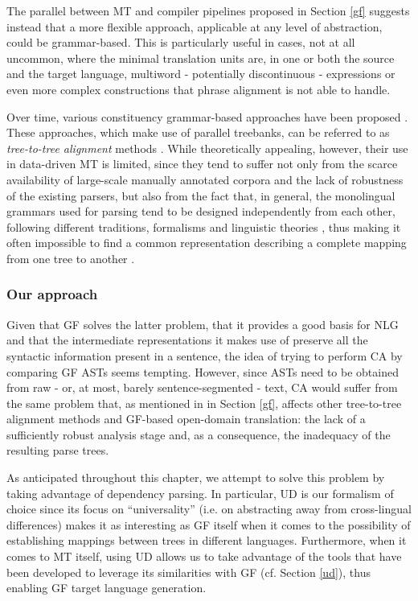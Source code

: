 The parallel between MT and compiler pipelines proposed in Section \ref{gf} suggests instead that a more flexible approach, applicable at any level of abstraction, could be grammar-based. 
This is particularly useful in cases, not at all uncommon, where the minimal translation units are, in one or both the source and the target language, multiword - potentially discontinuous - expressions or even more complex constructions that phrase alignment is not able to handle. \smallskip 

Over time, various constituency grammar-based approaches have been proposed \cite{t2t1, t2t2}. 
These approaches, which make use of parallel treebanks, can be referred to as \textit{tree-to-tree alignment} methods \cite{bitext}. 
While theoretically appealing, however, their use in data-driven MT is limited, since they tend to suffer not only from the scarce availability of large-scale manually annotated corpora and the lack of robustness of the existing parsers, but also from the fact that, in general, the monolingual grammars used for parsing tend to be designed independently from each other, following different traditions, formalisms and linguistic theories \cite{nlphandbook}, thus making it often impossible to find a common representation describing a complete mapping from one tree to another \cite{bitext}.

\subsubsection{Our approach} \label{ourapproach}
Given that GF solves the latter problem, that it provides a good basis for NLG and that the intermediate representations it makes use of preserve all the syntactic information present in a sentence, the idea of trying to perform CA by comparing GF ASTs seems tempting. 
However, since ASTs need to be obtained from raw - or, at most, barely sentence-segmented - text, CA would suffer from the same problem that, as mentioned in in Section \ref{gf}, affects other tree-to-tree alignment methods and GF-based open-domain translation: the lack of a sufficiently robust analysis stage and, as a consequence, the inadequacy of the resulting parse trees. \smallskip

As anticipated throughout this chapter, we attempt to solve this problem by taking advantage of dependency parsing. 
In particular, UD is our formalism of choice since its focus on ``universality'' (i.e. on abstracting away from cross-lingual differences) makes it as interesting as GF itself when it comes to the possibility of establishing mappings between trees in different languages. 
Furthermore, when it comes to MT itself, using UD allows us to take advantage of the tools that have been developed to leverage its similarities with GF (cf. Section \ref{ud}), thus enabling GF target language generation. \smallskip

